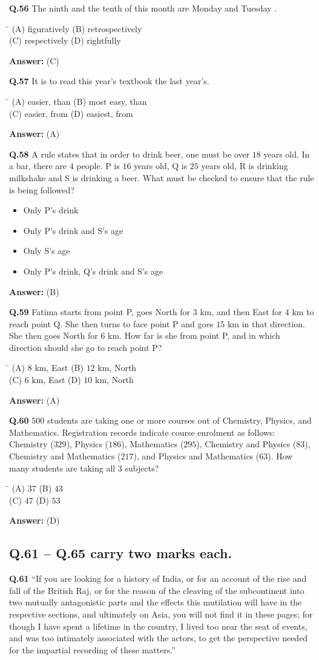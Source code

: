 \documentclass[11pt,a4paper]{article}
\newcommand{\optsfourA}[4]{%
  \begin{tabbing}
    \hspace{0.48\linewidth}\=\kill
    (A) #1 \> (B) #2 \\[2pt]
    (C) #3 \> (D) #4
  \end{tabbing}%
}
\newcommand{\optslistA}[4]{%
  \begin{itemize}
    \setlength{\itemsep}{2pt}\setlength{\parskip}{0pt}
    \item[(A)] #1
    \item[(B)] #2
    \item[(C)] #3
    \item[(D)] #4
  \end{itemize}%
}
\newcommand{\ans}[1]{\textbf{Answer:} #1\par\medskip}
\begin{document}
\textbf{Q.56} The ninth and the tenth of this month are Monday and Tuesday \underline{\hspace{2.5cm}}.
\optsfourA{figuratively}{retrospectively}{respectively}{rightfully}
\ans{(C)}

\textbf{Q.57} It is \underline{\hspace{2cm}} to read this year's textbook \underline{\hspace{2cm}} the last year's.
\optsfourA{easier, than}{most easy, than}{easier, from}{easiest, from}
\ans{(A)}

\textbf{Q.58} A rule states that in order to drink beer, one must be over $18$ years old. In a bar, there are $4$ people. P is $16$ years old, Q is $25$ years old, R is drinking milkshake and S is drinking a beer. What must be checked to ensure that the rule is being followed?
\optslistA{Only P's drink}{Only P's drink and S's age}{Only S's age}{Only P's drink, Q's drink and S's age}
\ans{(B)}

\textbf{Q.59} Fatima starts from point P, goes North for $3\text{ km}$, and then East for $4\text{ km}$ to reach point Q. She then turns to face point P and goes $15\text{ km}$ in that direction. She then goes North for $6\text{ km}$. How far is she from point P, and in which direction should she go to reach point P?
\optsfourA{$8\text{ km}$, East}{$12\text{ km}$, North}{$6\text{ km}$, East}{$10\text{ km}$, North}
\ans{(A)}

\textbf{Q.60} $500$ students are taking one or more courses out of Chemistry, Physics, and Mathematics. Registration records indicate course enrolment as follows: Chemistry ($329$), Physics ($186$), Mathematics ($295$), Chemistry and Physics ($83$), Chemistry and Mathematics ($217$), and Physics and Mathematics ($63$). How many students are taking all $3$ subjects?
\optsfourA{$37$}{$43$}{$47$}{$53$}
\ans{(D)}

\subsection*{Q.61 -- Q.65 carry two marks each.}

\textbf{Q.61} ``If you are looking for a history of India, or for an account of the rise and fall of the British Raj, or for the reason of the cleaving of the subcontinent into two mutually antagonistic parts and the effects this mutilation will have in the respective sections, and ultimately on Asia, you will not find it in these pages; for though I have spent a lifetime in the country, I lived too near the seat of events, and was too intimately associated with the actors, to get the perspective needed for the impartial recording of these matters.''
\end{document}
